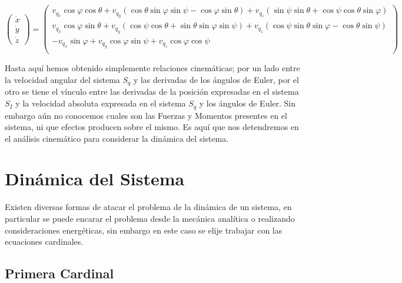 \documentclass[main]{subfiles}
\begin{document}
\begin{footnotesize}
\begin{equation}
\left( \begin{array}{c}
\dot{x}\\
\dot{y}\\
\dot{z}
\end{array}  \right) = \left( \begin{array}{c}
v_{q_x} \cos \varphi \cos \theta + v_{q_y} ( \cos \theta \sin \varphi \sin \psi-\cos \varphi \sin \theta ) + v_{q_z}(\sin \psi \sin \theta + \cos \psi \cos \theta \sin \varphi)  \\
v_{q_x} \cos \varphi \sin \theta + v_{q_y} (\cos \psi \cos \theta + \sin \theta \sin \varphi \sin \psi) + v_{q_z}( \cos \psi \sin \theta \sin \varphi-\cos \theta \sin \psi ) \\
-v_{q_x} \sin \varphi  + v_{q_y} \cos \varphi \sin \psi  + v_{q_z}\cos \varphi \cos \psi \\
\end{array} \right)
\label{eq:pospunto}
\end{equation}
\end{footnotesize} 

Hasta aqu\'i hemos obtenido simplemente relaciones cinem\'aticas; por un lado entre la velocidad angular del sistema $S_q$ y las derivadas de los \'angulos de Euler, por el otro se tiene el v\'inculo entre las derivadas de la posici\'on expresadas en el sistema $S_I$ y la velocidad absoluta expresada en el sistema $S_q$ y los \'angulos de Euler. Sin embargo a\'un no conocemos cuales son las Fuerzas y Momentos presentes en el sistema, ni que efectos producen sobre el mismo. Es aqu\'i que nos detendremos en el an\'alisis cinem\'atico para considerar la din\'amica del sistema. 

\section{Din\'amica del Sistema}
Existen diversas formas de atacar el problema de la din\'amica de un sistema, en particular se puede encarar el problema desde la mec\'anica anal\'itica o realizando consideraciones energ\'eticas, sin embargo en este caso se elije trabajar con las ecuaciones cardinales. 
\subsection{Primera Cardinal}
 
\end{document}
